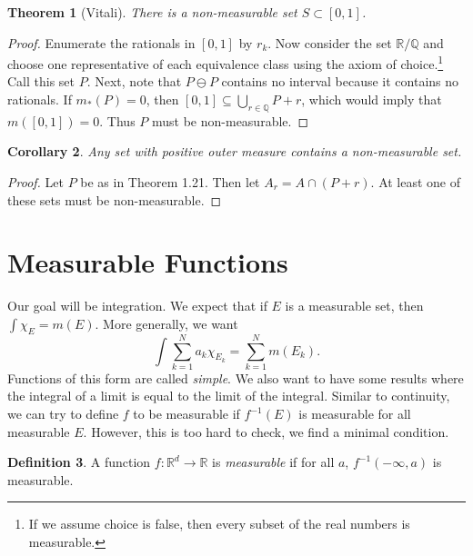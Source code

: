 \documentclass[leqno, openany]{memoir}
\newtheorem{thm}{Theorem}[chapter]
\newtheorem{cor}[thm]{Corollary}
\theoremstyle{definition}
\newtheorem{defn}[thm]{Definition}
\theoremstyle{remark}
\theoremstyle{plain}
\theoremstyle{definition}
\theoremstyle{remark}
\newcommand{\R}{\mathbb{R}}
\newcommand{\Q}{\mathbb{Q}}
\begin{document}
\begin{thm}[Vitali]
    There is a non-measurable set $S \subset [0,1]$.
\end{thm}

\begin{proof}
    Enumerate the rationals in $[0,1]$ by $r_k$. Now consider the set $\R / \Q$ and choose one representative of each equivalence class using the axiom of choice.\footnote{If we assume choice is false, then every subset of the real numbers is measurable.} Call this set $P$. Next, note that $P \ominus P$ contains no interval because it contains no rationals. If $m_*(P) = 0$, then $[0,1] \subseteq \bigcup_{r \in \Q} P + r$, which would imply that $m([0,1]) = 0$. Thus $P$ must be non-measurable.
\end{proof}

\begin{cor}
    Any set with positive outer measure contains a non-measurable set.
\end{cor}

\begin{proof}
    Let $P$ be as in Theorem 1.21. Then let $A_r = A \cap (P+r)$. At least one of these sets must be non-measurable.
\end{proof}

\section{Measurable Functions}%
\label{sec:measurable_functions}

Our goal will be integration. We expect that if $E$ is a measurable set, then $\int \chi_E = m(E)$. More generally, we want
\[ \int \sum_{k=1}^N a_k \chi_{E_k} = \sum_{k=1}^N m(E_k). \]
Functions of this form are called \textit{simple}. We also want to have some results where the integral of a limit is equal to the limit of the integral. Similar to continuity, we can try to define $f$ to be measurable if $f^{-1}(E)$ is measurable for all measurable $E$. However, this is too hard to check, we find a minimal condition.

\begin{defn}
    A function $f: \R^d \to \R$ is \textit{measurable} if for all $a$, $f^{-1}(-\infty, a)$ is measurable.
\end{defn}
\end{document}
